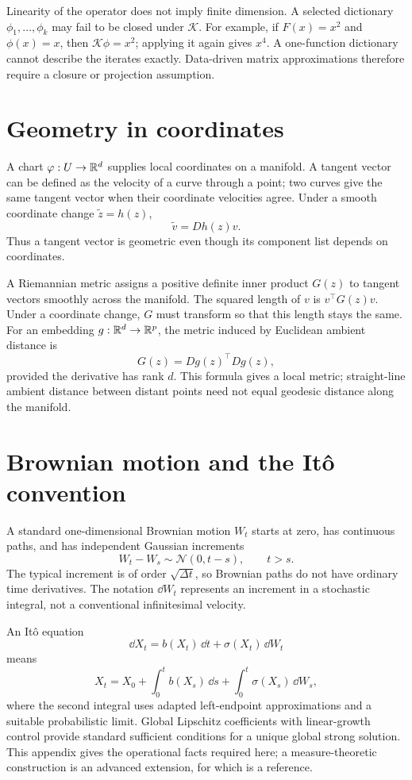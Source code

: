 Linearity of the operator does not imply finite dimension. A selected dictionary \(\phi_1,\ldots,\phi_k\) may fail to be closed under \(\mathcal K\). For example, if \(F(x)=x^2\) and \(\phi(x)=x\), then \(\mathcal K\phi=x^2\); applying it again gives \(x^4\). A one-function dictionary cannot describe the iterates exactly. Data-driven matrix approximations therefore require a closure or projection assumption.

\section{Geometry in coordinates}
A chart \(\varphi:U\to\mathbb{R}^d\) supplies local coordinates on a manifold. A tangent vector can be defined as the velocity of a curve through a point; two curves give the same tangent vector when their coordinate velocities agree. Under a smooth coordinate change \(\widetilde z=h(z)\),
\[
\widetilde v=Dh(z)v.
\]
Thus a tangent vector is geometric even though its component list depends on coordinates.

A Riemannian metric assigns a positive definite inner product \(G(z)\) to tangent vectors smoothly across the manifold. The squared length of \(v\) is \(v^\top G(z)v\). Under a coordinate change, \(G\) must transform so that this length stays the same. For an embedding \(g:\mathbb{R}^d\to\mathbb{R}^p\), the metric induced by Euclidean ambient distance is
\[
G(z)=Dg(z)^\top Dg(z),
\]
provided the derivative has rank \(d\). This formula gives a local metric; straight-line ambient distance between distant points need not equal geodesic distance along the manifold.

\section{Brownian motion and the It\^o convention}
A standard one-dimensional Brownian motion \(W_t\) starts at zero, has continuous paths, and has independent Gaussian increments
\[
W_t-W_s\sim\mathcal N(0,t-s),\qquad t>s.
\]
The typical increment is of order \(\sqrt{\Delta t}\), so Brownian paths do not have ordinary time derivatives. The notation \(\dd W_t\) represents an increment in a stochastic integral, not a conventional infinitesimal velocity.

An It\^o equation
\[
\dd X_t=b(X_t)\,\dd t+\sigma(X_t)\,\dd W_t
\]
means
\[
X_t=X_0+\int_0^t b(X_s)\,\dd s
+\int_0^t\sigma(X_s)\,\dd W_s,
\]
where the second integral uses adapted left-endpoint approximations and a suitable probabilistic limit. Global Lipschitz coefficients with linear-growth control provide standard sufficient conditions for a unique global strong solution. This appendix gives the operational facts required here; a measure-theoretic construction is an advanced extension, for which \citet{oksendal2003} is a reference.

